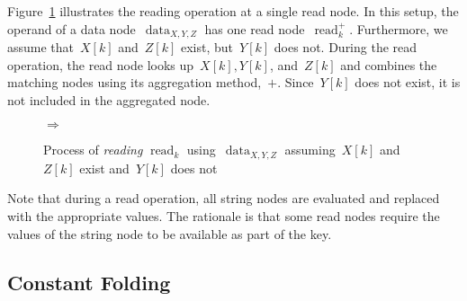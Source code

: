 \documentclass{article}
\DeclareMathOperator{\readNode}{read}
\DeclareMathOperator{\dataNode}{data}
\begin{document}
Figure~\ref{fig:modification:reading} illustrates the reading operation at a single read node.
In this setup, the operand of a data node~$\dataNode_{X,Y,Z}$ has one read node~$\readNode_k^+$.
Furthermore, we assume that~$X[k]$ and~$Z[k]$ exist, but~$Y[k]$ does not.
During the read operation, the read node looks up~$X[k], Y[k]$, and~$Z[k]$ and combines the matching nodes using its aggregation method,~$+$.
Since~$Y[k]$ does not exist, it is not included in the aggregated node.
%
\begin{figure}
	\centering
	\quad$\Rightarrow$\quad
	\caption{Process of \emph{reading} $\readNode_k$ using~$\dataNode_{X, Y, Z}$ assuming~$X[k]$ and~$Z[k]$ exist and~$Y[k]$ does not}
	\label{fig:modification:reading}
\end{figure}

Note that during a read operation, all string nodes are evaluated and replaced with the appropriate values.
The rationale is that some read nodes require the values of the string node to be available as part of the key.

\subsection{Constant Folding}
\end{document}
